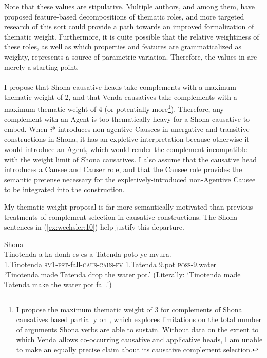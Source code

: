 \documentclass[output=paper,modfonts,nonflat,colorlinks,citecolor=brown]{langsci/langscibook}
\begin{document}
Note that these values are stipulative. Multiple authors, \citet{Wunderlich1997} and \citet{Mylne1999} among them, have proposed feature-based decompositions of thematic roles, and more targeted research of this sort could provide a path towards an improved formalization of thematic weight. Furthermore, it is quite possible that the relative weightiness of these roles, as well as which properties and features are grammaticalized as weighty, represents a source of parametric variation. Therefore, the values in  are merely a starting point.\\
\\
I propose that Shona causative heads take complements with a maximum thematic weight of 2, and that Venda causatives take complements with a maximum thematic weight of 4 (or potentially more\footnote{I propose the maximum thematic weight of 3 for complements of Shona causatives based partially on \citet{Wechsler2014}, which explores limitations on the total number of arguments Shona verbs are able to sustain. Without data on the extent to which Venda allows co-occurring causative and applicative heads, I am unable to make an equally precise claim about its causative complement selection.}). Therefore, any complement with an Agent is too thematically heavy for a Shona causative to embed. When \textit{i}* introduces non-agentive Causees in unergative and transitive constructions in Shona, it has an expletive interpretation because otherwise it would introduce an Agent, which would render the complement incompatible with the weight limit of Shona causatives. I also assume that the causative head introduces a Causee and Causer role, and that the Causee role provides the semantic pretense necessary for the expletively-introduced non-Agentive Causee to be integrated into the construction.



My thematic weight proposal is far more semantically motivated than previous treatments of complement selection in causative constructions. The Shona sentences in (\ref{ex:wechsler:10}) help justify this departure.

\newpage

\ea\label{ex:wechsler:10}
Shona\\
\ea\label{ex:wechsler:10a}
\gll Tinotenda {a-ka-donh-es-es-a}  {{Tatenda}}  {{poto}} {ye-mvura}.\\
 1.Tinotenda  \textsc{sm}1-\textsc{pst}{}-fall-\textsc{caus}{}-\textsc{caus}{}-\textsc{fv}  {1.Tatenda}  {9.pot}  \textsc{poss}{}-9.water\\
\glt `Tinotenda made Tatenda drop the water pot.’
(Literally: ‘Tinotenda made Tatenda make the water pot fall.’)\\
\end{document}
